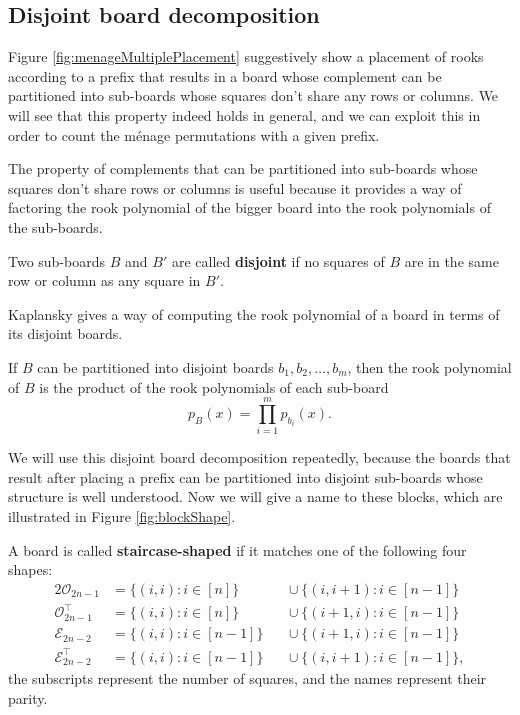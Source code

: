 \subsection{Disjoint board decomposition}
Figure \ref{fig:menageMultiplePlacement}
suggestively show a placement of
rooks according to a prefix that
results in a board whose complement can be partitioned into
sub-boards whose squares don't share any rows or columns.
We will see that this property indeed holds in general,
and we can exploit this in order to count the m\'enage permutations
with a given prefix.



The property of complements that can be partitioned into sub-boards
whose squares don't share rows or columns is useful because it provides
a way of factoring the rook polynomial of the bigger board into the rook
polynomials of the sub-boards.
\begin{definition}
  Two sub-boards $B$ and $B'$ are called \textbf{disjoint} if no squares of $B$ are
  in the same row or column as any square in $B'$.
\end{definition}

Kaplansky gives a way of computing the rook polynomial of a board in terms of
its disjoint boards.
\begin{theorem}
  If $B$ can be partitioned into disjoint boards $b_1, b_2, \dots, b_m$,
  then the rook polynomial of $B$ is the product of the rook polynomials of
  each sub-board \begin{equation}
    p_B(x) = \prod_{i=1}^m p_{b_i}(x).
  \end{equation}
\label{thm:productOfDisjointBoards}
\end{theorem}

We will use this disjoint board decomposition repeatedly, because the boards
that result
after placing a prefix can be partitioned into disjoint sub-boards whose
structure is well understood. Now we will give a name to these blocks,
which are illustrated in Figure \ref{fig:blockShape}.



\begin{definition}
  A board is called \textbf{staircase-shaped} if it matches one of the
  following four shapes:
  \begin{alignat*}{2}
    \mathcal{O}_{2n-1}           &= \{(i,i) : i \in [n]\}    &&\cup\ \{(i,i+1) : i \in [n-1]\} \\
    \mathcal{O}_{2n-1}^\intercal &= \{(i,i) : i \in [n]\}    &&\cup\ \{(i+1,i) : i \in [n-1]\} \\
    \mathcal{E}_{2n-2}           &= \{(i,i) : i \in [n-1]\}\ &&\cup\ \{(i+1,i) : i \in [n-1]\} \\
    \mathcal{E}_{2n-2}^\intercal &= \{(i,i) : i \in [n-1]\}\ &&\cup\ \{(i,i+1) : i \in [n-1]\},
  \end{alignat*}
  the subscripts represent the number of squares, and the names represent their
  parity.
  \label{def:staircaseShaped}
\end{definition}

